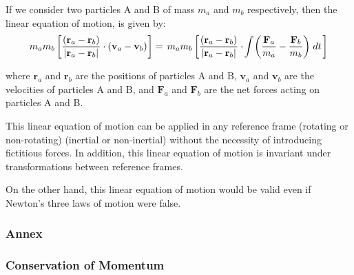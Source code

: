\documentclass[10pt]{article}
\newcommand{\mM}{m}
\newcommand{\ra}{_a}
\newcommand{\rb}{_b}
\newcommand{\vR}{\mathbf{r}}
\newcommand{\vV}{\mathbf{v}}
\newcommand{\vF}{\mathbf{F}}
\begin{document}
\par If we consider two particles A and B of mass $\mM\ra$ and $\mM\rb$ respectively, then the linear equation of motion, is given by:
{\fontsize{8}{8}\selectfont\begin{eqnarray*}
\mM\ra\mM\rb \left[ \frac{(\vR\ra - \vR\rb)}{|\vR\ra - \vR\rb|} \cdot (\vV\ra - \vV\rb) \hspace{+0.06em} \right] = \hspace{+0.15em} \mM\ra\mM\rb \left[ \frac{(\vR\ra - \vR\rb)}{|\vR\ra - \vR\rb|} \cdot \hspace{-0.12em} \int \hspace{-0.12em} \left(\frac{\vF\ra}{\mM\ra} - \frac{\vF\rb}{\mM\rb}\right) \hspace{+0.12em} dt \hspace{+0.12em} \right]
\end{eqnarray*}}
\vspace{-0.60em}
\par \noindent where $\vR\ra$ and $\vR\rb$ are the positions of particles A and B, $\vV\ra$ and $\vV\rb$ are the velocities of particles A and B, and $\vF\ra$ and $\vF\rb$ are the net forces acting on particles A and B.
\medskip
\par This linear equation of motion can be applied in any reference frame (rotating or non-rotating) (inertial or non-inertial) without the necessity of introducing fictitious forces. In addition, this linear equation of motion is invariant under transformations between reference frames.
\medskip
\par On the other hand, this linear equation of motion would be valid even if Newton's three laws of motion were false.

\newpage

{\centering\subsubsection*{Annex}}

\vspace{+0.90em}

{\centering\subsubsection*{Conservation of Momentum}}

\vspace{+0.90em}
\end{document}
